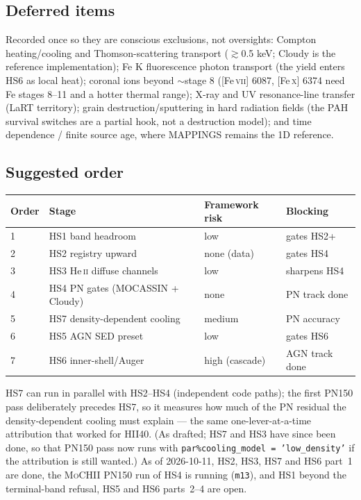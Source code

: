 \documentclass[english,a4paper]{my_memo}
\newcommand{\code}[1]{\texttt{#1}}
\newcommand{\MoCHII}{\textsc{MoCHII}}
\newcommand{\HeII}{He\,\textsc{ii}}
\begin{document}
\subsection{Deferred items}
\label{sec:harddeferred}

Recorded once so they are conscious exclusions, not oversights:
Compton heating/cooling and Thomson-scattering transport
($\gtrsim$0.5 keV; Cloudy is the reference implementation); Fe K
fluorescence photon transport (the yield enters HS6 as local heat);
coronal ions beyond $\sim$stage 8 ([Fe\,\textsc{vii}] 6087,
[Fe\,\textsc{x}] 6374 need Fe stages 8--11 and a hotter thermal range);
X-ray and UV resonance-line transfer (LaRT territory); grain
destruction/sputtering in hard radiation fields (the PAH survival
switches are a partial hook, not a destruction model); and time
dependence / finite source age, where MAPPINGS remains the 1D
reference.

\subsection{Suggested order}

\begin{center}\small
\begin{tabular}{P{0.06\textwidth}P{0.38\textwidth}P{0.20\textwidth}P{0.20\textwidth}}
\toprule
Order & Stage & Framework risk & Blocking \\
 & HS1 band headroom & low & gates HS2+ \\
2 & HS2 registry upward & none (data) & gates HS4 \\
3 & HS3 \HeII{} diffuse channels & low & sharpens HS4 \\
4 & HS4 PN gates (MOCASSIN + Cloudy) & none & PN track done \\
5 & HS7 density-dependent cooling & medium & PN accuracy \\
6 & HS5 AGN SED preset & low & gates HS6 \\
7 & HS6 inner-shell/Auger & high (cascade) & AGN track done \\
\bottomrule
\end{tabular}
\end{center}

HS7 can run in parallel with HS2--HS4 (independent code paths); the
first PN150 pass deliberately precedes HS7, so it measures how much of
the PN residual the density-dependent cooling must explain --- the same
one-lever-at-a-time attribution that worked for HII40.  (As drafted; HS7 and
HS3 have since been done, so that PN150 pass now runs with
\code{par\%cooling\_model = 'low\_density'} if the attribution is still
wanted.)  As of 2026-10-11, HS2, HS3, HS7 and HS6 part~1 are done, the \MoCHII{}
PN150 run of HS4 is running (\code{m13}), and HS1 beyond the terminal-band refusal, HS5 and
HS6 parts~2--4 are open.
\end{document}
